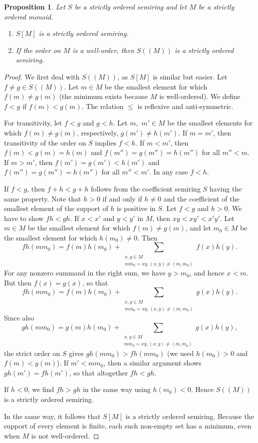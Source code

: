 \documentclass{amsart}
\theoremstyle{plain}
\newtheorem{proposition}[thm]{Proposition}
\theoremstyle{definition}
\newcommand{\hmnser}[2]{{#1}(\!({#2})\!)}
\begin{document}
\begin{proposition} \label{p:semiring-order}\mbox{}
  Let $S$ be a strictly ordered semiring and let $M$ be a strictly ordered monoid.
  \begin{enumerate}
    \item $S[M]$ is a strictly ordered semiring.
    \item If the order on $M$ is a well-order, then $\hmnser{S}{M}$ is a strictly ordered semiring.
  \end{enumerate}
\end{proposition}

\begin{proof}
  We first deal with $\hmnser{S}{M}$, as $S[M]$ is similar but easier.
  Let $f \ne g \in \hmnser{S}{M}$.
  Let $m \in M$ be the smallest element for which $f(m) \ne g(m)$ (the minimum exists because $M$ is well-ordered).
  We define $f < g$ if  $f(m) < g(m)$.
  The relation $\le$ is reflexive and anti-symmetric.

  For transitivity, let $f < g$ and $g < h$. Let $m$,~$m' \in M$ be the smallest elements for which $f(m) \ne g(m)$, respectively, $g(m') \ne h(m')$.
  If $m=m'$, then transitivity of the order on $S$ implies $f <h$.
  If $m < m'$, then $f(m) < g(m) = h(m)$ and $f(m'')=g(m'')=h(m'')$ for all $m'' < m$.
  If $m > m'$, then $f(m')=g(m')<h(m')$ and $f(m'')=g(m'')=h(m'')$ for all $m'' < m'$.
  In any case $f < h$.

  If $f < g$, then $f+h < g+h$ follows from the coefficient semiring $S$ having the same property.
  Note that $h > 0$ if and only if $h \ne 0$ and the coefficient of the smallest element of the support of $h$ is positive in $S$.
  Let $f < g$ and $h> 0$. We have to show $fh < gh$.
  If $x < x'$ and $y < y'$ in $M$, then $xy < xy' < x'y'$.
  Let $m \in M$ be the smallest element for which $f(m) \ne g(m)$, and let $m_0 \in M$ be the smallest element for which $h(m_0) \ne 0$.
  Then
  \[
  fh(mm_0) = f(m)h(m_0) + \sum_{\substack{x,y \in M \\ mm_0=xy,  (x,y) \ne (m,m_0)}} f(x)h(y).
  \]
  For any nonzero summand in the right sum, we have $y > m_0$, and hence $x < m$.
  But then $f(x)=g(x)$, so that
  \[
  fh(mm_0) =  f(m)h(m_0) + \sum_{\substack{x,y \in M \\ mm_0=xy,  (x,y) \ne (m,m_0)}} g(x)h(y).
  \]
  Since also
  \[
  gh(mm_0) =  g(m)h(m_0) + \sum_{\substack{x,y \in M \\ mm_0=xy,  (x,y) \ne (m,m_0)}} g(x)h(y),
  \]
  the strict order on $S$ gives $gh(mm_0) > fh(mm_0)$ (we used $h(m_0) > 0$ and $f(m) < g(m)$).
  If $m' < mm_0$, then a similar argument shows $gh(m')=fh(m')$, so that altogether $fh < gh$.

  If $h < 0$, we find $fh > gh$ in the same way using $h(m_0) < 0$.
  Hence $\hmnser{S}{M}$ is a strictly ordered semiring.

  In the same way, it follows that $S[M]$ is a strictly ordered semiring.
  Because the support of every element is finite, each such non-empty set has a minimum, even when $M$ is not well-ordered.
\end{proof}
\end{document}
